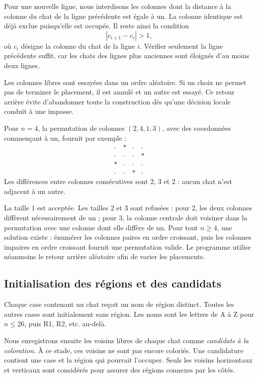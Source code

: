 \documentclass[11pt,a4paper]{article}
\begin{document}
Pour une nouvelle ligne, nous interdisons les colonnes dont la distance
à la colonne du chat de la ligne précédente est égale à un. La colonne
identique est déjà exclue puisqu'elle est occupée. Il reste ainsi la condition
\[
  |c_{i+1}-c_i|>1,
\]
où $c_i$ désigne la colonne du chat de la ligne $i$. Vérifier seulement
la ligne précédente suffit, car les chats des lignes plus anciennes sont
éloignés d'au moins deux lignes.

Les colonnes libres sont essayées dans un ordre aléatoire. Si un choix ne
permet pas de terminer le placement, il est annulé et un autre est essayé.
Ce retour arrière évite d'abandonner toute la construction dès qu'une
décision locale conduit à une impasse.

Pour $n=4$, la permutation de colonnes $(2,4,1,3)$, avec des coordonnées
commençant à un, fournit par exemple :
\[
\begin{matrix}
\cdot&\ast&\cdot&\cdot\\
\cdot&\cdot&\cdot&\ast\\
\ast&\cdot&\cdot&\cdot\\
\cdot&\cdot&\ast&\cdot
\end{matrix}
\]
Les différences entre colonnes consécutives sont $2$, $3$ et $2$ :
aucun chat n'est adjacent à un autre.

La taille $1$ est acceptée. Les tailles $2$ et $3$ sont refusées :
pour $2$, les deux colonnes diffèrent nécessairement de un ; pour $3$,
la colonne centrale doit voisiner dans la permutation avec une colonne
dont elle diffère de un. Pour tout $n\geq4$, une solution existe :
énumérer les colonnes paires en ordre croissant, puis les colonnes impaires
en ordre croissant fournit une permutation valide. Le programme utilise
néanmoins le retour arrière aléatoire afin de varier les placements.

\subsection{Initialisation des régions et des candidats}

Chaque case contenant un chat reçoit un nom de région distinct.
Toutes les autres cases sont initialement sans région. Les noms sont
les lettres de A à Z pour $n\leq26$, puis R1, R2, etc. au-delà.

Nous enregistrons ensuite les voisins libres de chaque chat comme
\emph{candidats à la coloration}. À ce stade, ces voisins ne sont pas
encore coloriés. Une candidature contient une case et la région qui
pourrait l'occuper. Seuls les voisins horizontaux et verticaux sont
considérés pour assurer des régions connexes par les côtés.
\end{document}
